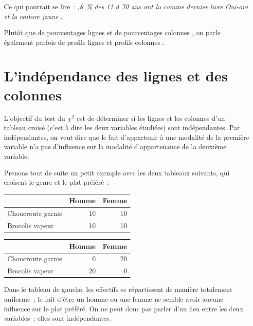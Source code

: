 \documentclass[a4paper,10pt,twoside,francais]{report}
\newcommand{\chid}{$\chi^2$\xspace}
\begin{document}
Ce qui pourrait se lire~: \textit{,8~\% des 11 à 70 ans ont lu
  comme dernier livre \textrm{Oui-oui et la voiture jaune} \fg{}}.

Plutôt que de \og pourcentages lignes \fg{} et de \og pourcentages
colonnes \fg{}, on parle également parfois de \og profils lignes \fg{}
et \og profils colonnes \fg{}.


\section{L'indépendance des lignes et des colonnes}
\label{ssec-hypindep}

L'objectif du test du \chid est de déterminer si les lignes et les
colonnes d'un tableau croisé (c'est à dire les deux variables
étudiées) sont indépendantes. Par indépendantes, on veut dire
que le fait d'appartenir à une modalité de la première variable n'a
pas d'influence sur la modalité d'appartenance de la deuxième
variable.

Prenons tout de suite un petit exemple avec les deux tableaux
suivants, qui croisent le genre et le plat préféré~:

\begin{center}
  \hfill
  \begin{minipage}[c]{.46\linewidth}
    \begin{tabular}[!h]{lrr}
      \toprule
      & Homme & Femme \\
      \midrule
      Choucroute garnie & 10 & 10 \\
      Brocolis vapeur & 10 & 10 \\
      \bottomrule
    \end{tabular}
  \end{minipage} 
  \hfill
  \begin{minipage}[c]{.46\linewidth}
    \begin{tabular}[!h]{lrr}
      \toprule
      & Homme & Femme \\
      \midrule
      Choucroute garnie & 0 & 20 \\
      Brocolis vapeur &  20 & 0 \\
      \bottomrule
    \end{tabular}
  \end{minipage}
  \hfill
\end{center}

Dans le tableau de gauche, les effectifs se répartissent de manière
totalement uniforme~: le fait d'être un homme ou une femme ne semble
avoir aucune influence sur le plat préféré. On ne peut donc pas parler
d'un lien entre les deux variables~: elles sont indépendantes.
\end{document}
